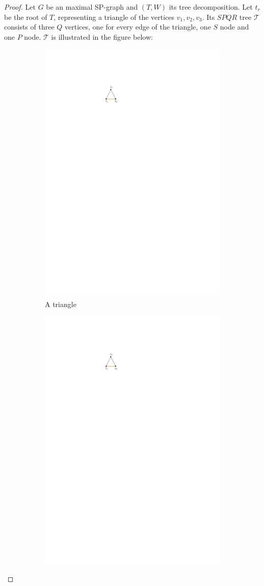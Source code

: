 \begin{proof}
	Let $G$ be an maximal SP-graph and $(T,W)$ its tree decomposition. Let $t_r$ be the root of $T$, representing a triangle of the vertices $v_1,v_2,v_3$. Its $SPQR$ tree $\mathcal{T}$ consists of three $Q$ vertices, one for every edge of the triangle, one $S$ node and one $P$ node. $\mathcal{T}$ is illustrated in the figure below:
	\begin{figure}[H]
		\begin{subfigure}{0.4\textwidth}
			\centering
			\includegraphics[page=1,width=0.7\linewidth]{graphics/SP_graphs_SPQR_inserting.pdf}
			\caption{A triangle}\label{im:SPQR_insert_a}
		\end{subfigure}
		\begin{subfigure}{0.4\textwidth}
			\centering
			\includegraphics[page=2,width=0.7\linewidth]{graphics/SP_graphs_SPQR_inserting.pdf}

\end{subfigure}
\end{figure}
\end{proof}
